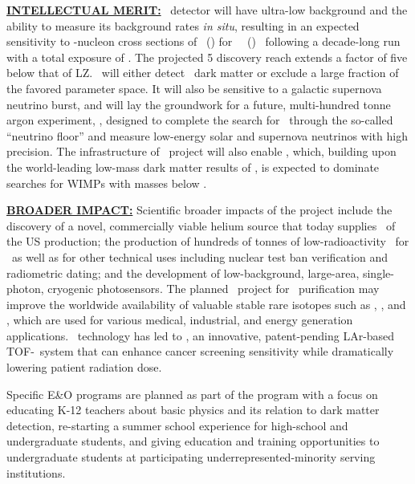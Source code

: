\vskip0.05in
{\underline {\bf INTELLECTUAL MERIT:}}
\DSks\ detector will have ultra-low background and the ability to measure its background rates {\it in situ}, resulting in an expected sensitivity to \WIMP-nucleon cross sections of \DSkExtendedSensitivityOneGeVUnit\ (\DSkExtendedSensitivityTenGeVUnit) for \ \WIMPMassOneTev\ (\WIMPMassTenTev) \WIMPs\ following a decade-long run with a total exposure  of \DSkExtendedExposure.  The projected \SI{5}{\sgm} discovery reach extends a factor of five below that of LZ.  \DSks\ will either detect \WIMP\ dark matter or exclude a large fraction of the favored parameter space. It will also be sensitive to a galactic supernova neutrino burst, and will lay the groundwork for a future, multi-hundred tonne argon experiment, \Argo, designed to complete the search for \WIMPs\ through the so-called ``neutrino floor'' and measure low-energy solar and supernova neutrinos with high precision. The infrastructure of \DSk\ project will also enable \DSl, which, building upon the world-leading low-mass dark matter results of \DSfs, is expected to dominate searches for WIMPs with masses below \DSlLowMassThreshold.

\vskip0.05in
{\underline {\bf BROADER IMPACT:}}
Scientific broader impacts of the project include the discovery of a novel, commercially viable helium source that today supplies \UraniaHeNationalReserveFractionEquivalentRate\ of the US production;
the production of hundreds of tonnes of low-radioactivity \UAr\ for \DSks\ as well as for other technical uses including nuclear test ban verification and radiometric dating; and the development of low-background, large-area, single-photon, cryogenic photosensors.  The planned \Aria\ project for \UAr\ purification may improve the worldwide availability of valuable stable rare isotopes such as , , and , which are used for various medical, industrial, and energy generation applications.  \LArTPC\ technology has led to \ThreeDPi, an innovative, patent-pending LAr-based TOF-\PET\ system that can enhance cancer screening sensitivity while dramatically lowering patient radiation dose. 

Specific E\&O programs are planned as part of the program with a focus on educating K-12 teachers about basic physics and its relation to dark matter detection, re-starting a summer school experience for high-school and undergraduate students, and giving education and training opportunities to undergraduate students at participating underrepresented-minority serving institutions.